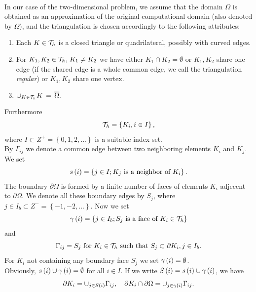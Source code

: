 		  \paragraph{}
		  In our case of the two-dimensional problem, we assume that the domain $\Omega$ is obtained as an approximation of the original computational domain (also denoted by $\Omega$), and the triangulation is chosen accordingly to the following attributes:
		  \renewcommand{\labelenumi}{\Alph{enumi})}
		  \begin{enumerate}
		  \item Each $K\in\mathcal{T}_h$ is a closed triangle or quadrilateral, possibly with curved edges.
		  \item For $K_1,K_2\in\mathcal{T}_h,\,K_1\neq{K}_2$ we have either $K_1\cap{K}_2 = \emptyset$ or $K_1,K_2$ share one edge (if the shared edge is a whole common edge, we call the triangulation \emph{regular}) or $K_1,K_2$ share one vertex.
		  \item$\cup_{K\in\mathcal{T}_h}K\,=\,\overline{\Omega}.$
		  \end{enumerate}
		  Furthermore
		  $$
		  \mathcal{T}_h = \left\{K_i, i\in I\right\},
		  $$
		  where $I\subset Z^+ = \left\{0, 1, 2, ...\right\}$ is a suitable index set.\\
		  By $\Gamma_{ij}$ we denote a common edge between two
		  neighboring elements $K_i$ and $K_j$. We set 
		  $$s
		  \left( i\right) = \left\{j\in I; K_j \text{ is a neighbor of } K_i\right\}.
		  $$
		  The boundary $\partial\Omega$ is formed by a finite number of faces of elements $K_i$ adjecent to
		  $\partial\Omega$. We denote all these boundary edges by $S_j$, where $j\in I_b\subset Z^{-} = \left\{-1, -2, ...\right\}$.
		  Now we set 
		  $$
		  \gamma\left( i \right) = \left\{j\in I_b; S_j \text{ is a face of } K_i\in\mathcal{T}_h\right\}
		  $$ 
		  and 
		  $$
		  \Gamma_{ij} = S_j\text{ for } K_i\in \mathcal{T}_h\text{ such that }S_j\subset\partial K_i, j\in I_b.
		  $$
		  For $K_i$ not containing any boundary face $S_j$ we set $\gamma\left( i \right) = \emptyset$.\\
		  Obviously, $s\left( i \right) \cup\gamma\left( i\right) = \emptyset$ for all $i\in I$. If we write $S\left( i \right) = s \left( i\right) \cup \gamma\left( i \right)$, we have
		  $$
		  \partial K_i = \cup_{j\in S\left( i \right)}\Gamma_{ij},\ \ \ \partial K_i\cap\partial{\Omega} = \cup_{j\in\gamma\left( i \right)}\Gamma_{ij}.
		  $$
\ \\
